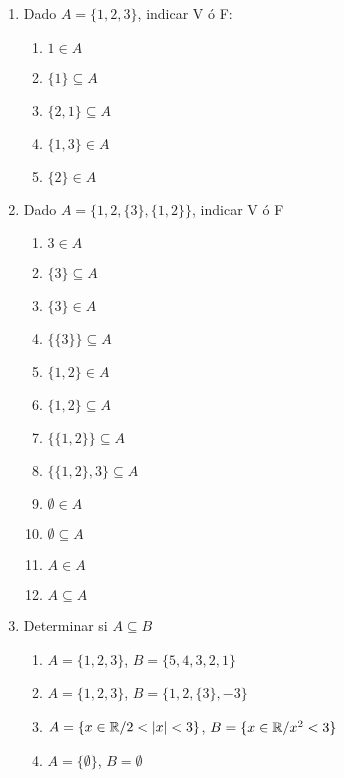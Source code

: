 \documentclass[../practica.root.tex]{subfiles}
\begin{document}
\begin{enumerate}
    \item Dado $A = \{1, 2, 3\}$, indicar V ó F:
          \begin{enumerate}
              \item $1 \in A$ \cmark
              \item $\{1\} \subseteq A$ \cmark
              \item $\{2, 1\} \subseteq A$ \cmark
              \item $\{1, 3\} \in A$ \xmark
              \item $\{2\} \in A$ \xmark
          \end{enumerate}

    \item Dado $A = \{1, 2, \{3\}, \{1, 2\}\}$, indicar V ó F
          \begin{enumerate}
              \item $3 \in A$ \xmark
              \item $\{3\} \subseteq A$ \xmark
              \item $\{3\} \in A$ \cmark
              \item $\{\{3\}\} \subseteq A$ \cmark
              \item $\{1, 2\} \in A$ \cmark
              \item $\{1, 2\} \subseteq A$ \cmark
              \item $\{\{1, 2\}\} \subseteq A$ \cmark
              \item $\{\{1, 2\}, 3\} \subseteq A$ \xmark
              \item $\emptyset \in A$ \xmark
              \item $\emptyset \subseteq A$ \cmark
              \item $A \in A$ \xmark
              \item $A \subseteq A$ \cmark
          \end{enumerate}

    \item Determinar si $A \subseteq B$
          \begin{enumerate}
              \item $A = \{1, 2, 3\}$, $B = \{5, 4, 3, 2, 1\}$ \cmark
              \item $A = \{1, 2, 3\}$, $B = \{1, 2, \{3\}, -3\}$ \xmark
              \item $A = \{x \in \mathbb{R} / 2 < |x| < 3\}$, $B = \{x \in \mathbb{R} / x^2 < 3\}$ \xmark
              \item $A = \{\emptyset\}$, $B = \emptyset$ \xmark
          \end{enumerate}


\end{enumerate}
\end{document}
